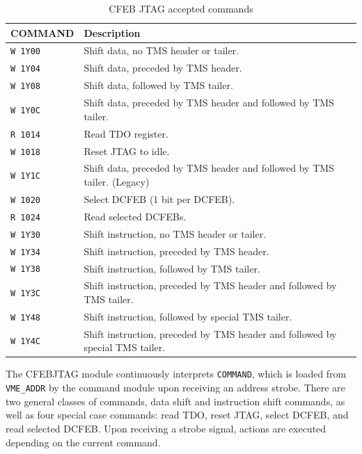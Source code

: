 \documentclass[10pt,a4paper]{article}
\begin{document}
\begin{table}[H]
\centering
\begin{tabular}{|l|l|} \hline
COMMAND& Description\\ \hline
\texttt{W 1Y00}& Shift data, no TMS header or tailer.\\ \hline
\texttt{W 1Y04}& Shift data, preceded by TMS header.\\ \hline
\texttt{W 1Y08}& Shift data, followed by TMS tailer.\\ \hline
\texttt{W 1Y0C}& Shift data, preceded by TMS header and followed by TMS tailer.\\ \hline
\texttt{R 1014}& Read TDO register.\\ \hline
\texttt{W 1018}& Reset JTAG to idle.\\ \hline
\texttt{W 1Y1C}& Shift data, preceded by TMS header and followed by TMS tailer. (Legacy)\\ \hline
\texttt{W 1020}& Select DCFEB (1 bit per DCFEB).\\ \hline
\texttt{R 1024}& Read selected DCFEBs.\\ \hline
\texttt{W 1Y30}& Shift instruction, no TMS header or tailer.\\ \hline
\texttt{W 1Y34}& Shift instruction, preceded by TMS header.\\ \hline
\texttt{W 1Y38}& Shift instruction, followed by TMS tailer.\\ \hline
\texttt{W 1Y3C}& Shift instruction, preceded by TMS header and followed by TMS tailer.\\ \hline
\texttt{W 1Y48}& Shift instruction, followed by special TMS tailer.\\ \hline
\texttt{W 1Y4C}& Shift instruction, preceded by TMS header and followed by special TMS tailer.\\ \hline
\end{tabular}
\caption{CFEB JTAG accepted commands}
\label{tab:cfebjtagcommands}
\end{table}

The CFEBJTAG module continuously interprets \texttt{COMMAND}, which is loaded from \texttt{VME\_ADDR} by the command module upon receiving an address strobe. There are two general classes of commands, data shift and instruction shift commands, as well as four special case commands: read TDO, reset JTAG, select DCFEB, and read selected DCFEB. Upon receiving a strobe signal, actions are executed depending on the current command.
\end{document}
